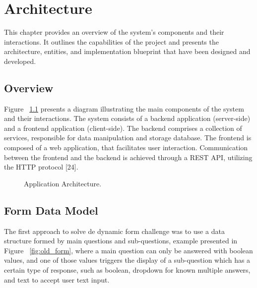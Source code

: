 %
%
\chapter{Architecture} \label{cap:architecture}

This chapter provides an overview of the system’s components and their interactions.
It outlines the capabilities of the project and presents the architecture, entities, and
implementation blueprint that have been designed and developed.

\section{Overview}

Figure ~\ref{fig:architecture} presents a diagram illustrating the main components of the system and their interactions. The system consists of a backend application (server-side) and a frontend application (client-side).
The backend comprises a collection of services, responsible for data manipulation and storage database.
The frontend is composed of a web application, that facilitates user interaction. Communication between the frontend and the backend is achieved through a REST API, utilizing the HTTP protocol [24].

\begin{figure}[H]
	\begin{center}
	\end{center}
	\caption{Application Architecture.}\label{fig:architecture}
\end{figure}

\section{Form Data Model}

The first approach to solve de dynamic form challenge was to use a data structure formed by main questions and sub-questions, example presented in Figure ~\ref{fig:old_form}, where a main question can only be answered with boolean values, and one of those values triggers the display of a sub-question which has a certain type of response, such as boolean, dropdown for known multiple answers, and text to accept user text input.


